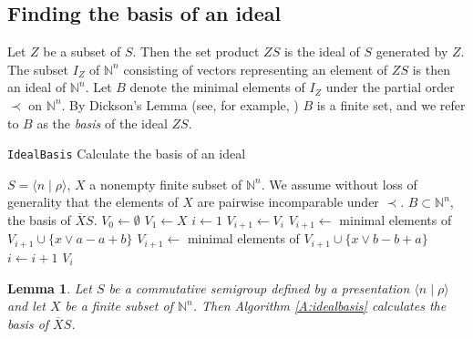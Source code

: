 \documentclass[12pt]{article}
\newtheorem{lemma}{\bf Lemma}
\begin{document}
\subsection{Finding the basis of an ideal}

Let $Z$ be a subset of $S$. Then the set product $ZS$ is the ideal of 
$S$ generated by $Z$. The subset $I_Z$ of $\mathbb{N}^n$ consisting 
of vectors representing an element of $ZS$ 
is then an ideal of $\mathbb{N}^n$. Let $B$ denote the minimal 
elements of $I_Z$ under the partial order $\prec$ on $\mathbb{N}^n$.
By Dickson's Lemma (see, for example, \cite{bBeckWeis}) $B$ is a finite set,
and we refer to $B$ as the {\em basis} of the ideal $ZS$.

\begin{algorithm}
\caption{{\tt IdealBasis} Calculate the basis of an ideal}
\label{A:idealbasis}
\begin{algorithmic}[1]
\REQUIRE $S = \langle n \mid \rho \rangle$, $X$ a nonempty finite
subset of $\mathbb{N}^n$.
We assume without loss of generality that the elements of $X$ are 
pairwise incomparable under $\prec$.
\ENSURE $B \subset \mathbb{N}^n$, the basis of $\overline{X}S$.
\STATE $V_0 \leftarrow \emptyset$
\STATE $V_1 \leftarrow X$
\STATE $i \leftarrow 1$
        \STATE $V_{i+1} \leftarrow V_i$
                 \label{step:forward}
                        \STATE $V_{i+1} \leftarrow $ minimal elements of 
                                $V_{i+1} \cup \{x \vee a - a + b\}$
                        \STATE $V_{i+1} \leftarrow $ minimal elements of 
                                $V_{i+1} \cup \{x \vee b - b + a\}$
                \ENDFOR
        \ENDFOR
        \STATE $i \leftarrow i + 1$
\ENDWHILE
{} $V_i$
\end{algorithmic}
\end{algorithm}

\begin{lemma}
Let $S$ be a commutative semigroup defined by a presentation $\langle
n\mid\rho\rangle$ and let $X$ be a finite subset of $\mathbb{N}^n$. Then
Algorithm \ref{A:idealbasis} calculates the basis
of $\overline{X}S$.
\end{lemma}
\end{document}
